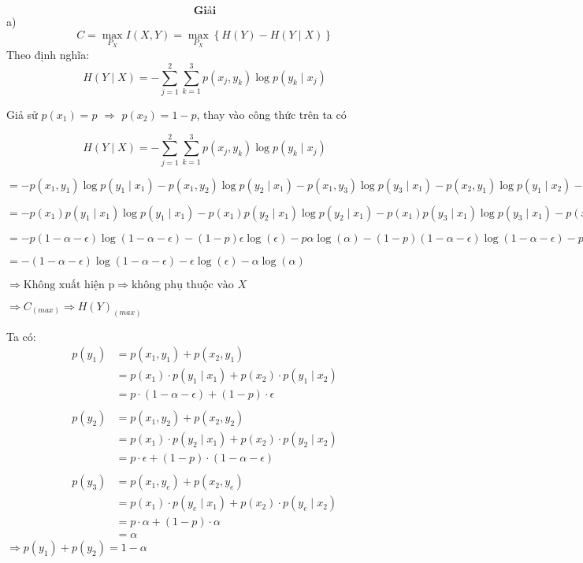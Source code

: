 \documentclass[12pt]{article}
\begin{document}
\[
\textbf{Giải}
\]
a)
\[
C = \max_{P_X} I(X, Y) = \max_{P_X} \left\{ H(Y) - H(Y \mid X) \right\}
\]
Theo định nghĩa:
\[
H(Y \mid X) = -\sum_{j=1}^{2} \sum_{k=1}^{3} p(x_j, y_k) \log p(y_k \mid x_j)
\]

Giả sử $p(x_1)=p$ $\Rightarrow$ $p(x_2)=1-p$, thay vào công thức trên ta có


\[
H(Y \mid X) = -\sum_{j=1}^{2} \sum_{k=1}^{3} p(x_j, y_k) \log p(y_k \mid x_j)
\]

$= - 
p(x_1, y_1) \log p(y_1 \mid x_1) -
p(x_1, y_2) \log p(y_2 \mid x_1) -
p(x_1, y_3) \log p(y_3 \mid x_1) -
p(x_2, y_1) \log p(y_1 \mid x_2) -
p(x_2, y_2) \log p(y_2 \mid x_2) -
p(x_2, y_3) \log p(y_3 \mid x_2)
$

$= - 
p(x_1) p(y_1 \mid x_1) \log p(y_1 \mid x_1) -
p(x_1) p(y_2 \mid x_1) \log p(y_2 \mid x_1) -
p(x_1) p(y_3 \mid x_1) \log p(y_3 \mid x_1) -
p(x_2) p(y_1 \mid x_2) \log p(y_1 \mid x_2) -
p(x_2) p(y_2 \mid x_2) \log p(y_2 \mid x_2) -
p(x_2) p(y_3 \mid x_2) \log p(y_3 \mid x_2)
$

$= -
p(1 - \alpha - \epsilon)\log(1 - \alpha - \epsilon) -
(1-p)\epsilon\log(\epsilon) -
p\alpha\log(\alpha) -
(1-p)(1 - \alpha - \epsilon)\log(1 - \alpha - \epsilon) -
p\epsilon\log(\epsilon) -
(1-p)\alpha\log(\alpha)$

$= -
(1 - \alpha - \epsilon)\log(1 - \alpha - \epsilon) -
\epsilon\log(\epsilon) -
\alpha\log(\alpha)
$

$\Rightarrow \text{Không xuất hiện p} \Rightarrow \text{không phụ thuộc vào } X$

$\Rightarrow C_(max) \Rightarrow H(Y)_(max)$

Ta có:
\[
\begin{aligned}
p(y_1) &= p(x_1, y_1) + p(x_2, y_1) \\
       &= p(x_1) \cdot p(y_1 \mid x_1) + p(x_2) \cdot p(y_1 \mid x_2) \\
       &= p \cdot (1 - \alpha - \epsilon) + (1 - p) \cdot \epsilon \\
\\
p(y_2) &= p(x_1, y_2) + p(x_2, y_2) \\
       &= p(x_1) \cdot p(y_2 \mid x_1) + p(x_2) \cdot p(y_2 \mid x_2) \\
       &= p \cdot \epsilon + (1 - p) \cdot (1 - \alpha - \epsilon) \\
\\
p(y_3) &= p(x_1, y_e) + p(x_2, y_e) \\
       &= p(x_1) \cdot p(y_e \mid x_1) + p(x_2) \cdot p(y_e \mid x_2) \\
       &= p \cdot \alpha + (1 - p) \cdot \alpha \\
       &= \alpha
\end{aligned}
\]
$\Rightarrow p(y_1)+p(y_2)=1-\alpha$
\end{document}
